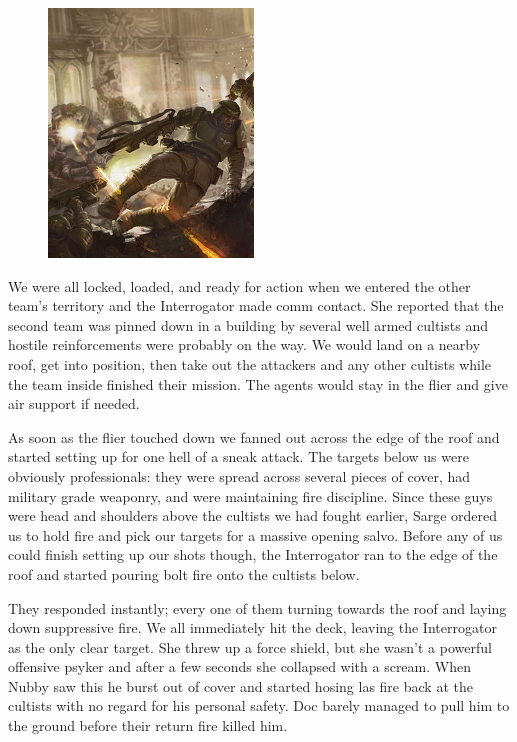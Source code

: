 \begin{figure}
	\begin{center}
		\includegraphics[width=\figwidth]{pics/5/19.png}
	\end{center}
\end{figure}
We were all locked, loaded, and ready for action when we entered the other team’s territory and the Interrogator made comm contact. 
She reported that the second team was pinned down in a building by several well armed cultists and hostile reinforcements were probably on the way. 
We would land on a nearby roof, get into position, then take out the attackers and any other cultists while the team inside finished their mission. 
The agents would stay in the flier and give air support if needed.

As soon as the flier touched down we fanned out across the edge of the roof and started setting up for one hell of a sneak attack. 
The targets below us were obviously professionals: 
they were spread across several pieces of cover, had military grade weaponry, and were maintaining fire discipline. 
Since these guys were head and shoulders above the cultists we had fought earlier, Sarge ordered us to hold fire and pick our targets for a massive opening salvo. 
Before any of us could finish setting up our shots though, the Interrogator ran to the edge of the roof and started pouring bolt fire onto the cultists below.

They responded instantly; 
every one of them turning towards the roof and laying down suppressive fire. 
We all immediately hit the deck, leaving the Interrogator as the only clear target.
She threw up a force shield, but she wasn’t a powerful offensive psyker and after a few seconds she collapsed with a scream.
When Nubby saw this he burst out of cover and started hosing las fire back at the cultists with no regard for his personal safety. 
Doc barely managed to pull him to the ground before their return fire killed him. 

